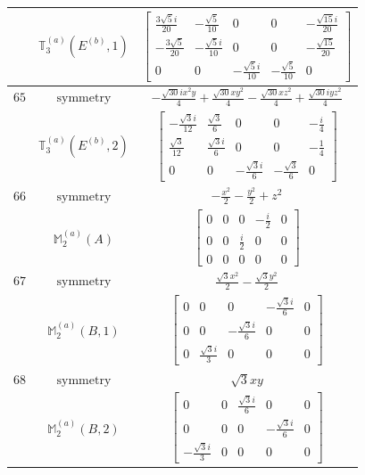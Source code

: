 \documentclass[fleqn,8pt,landscape]{jsarticle}
\begin{document}
\begin{longtable}{ccc}
$  $ & $ \mathbb{T}_{3}^{(a)}(E^{(b)},1) $ & $ \begin{bmatrix} \frac{3 \sqrt{5} i}{20} & - \frac{\sqrt{5}}{10} & 0 & 0 & - \frac{\sqrt{15} i}{20} \\ - \frac{3 \sqrt{5}}{20} & - \frac{\sqrt{5} i}{10} & 0 & 0 & - \frac{\sqrt{15}}{20} \\ 0 & 0 & - \frac{\sqrt{5} i}{10} & - \frac{\sqrt{5}}{10} & 0 \end{bmatrix} $ \\ \hline
$ 65 $ & $ \text{symmetry} $ & $ - \frac{\sqrt{30} i x^{2} y}{4} + \frac{\sqrt{30} x y^{2}}{4} - \frac{\sqrt{30} x z^{2}}{4} + \frac{\sqrt{30} i y z^{2}}{4} $ \\
$  $ & $ \mathbb{T}_{3}^{(a)}(E^{(b)},2) $ & $ \begin{bmatrix} - \frac{\sqrt{3} i}{12} & \frac{\sqrt{3}}{6} & 0 & 0 & - \frac{i}{4} \\ \frac{\sqrt{3}}{12} & \frac{\sqrt{3} i}{6} & 0 & 0 & - \frac{1}{4} \\ 0 & 0 & - \frac{\sqrt{3} i}{6} & - \frac{\sqrt{3}}{6} & 0 \end{bmatrix} $ \\ \hline
$ 66 $ & $ \text{symmetry} $ & $ - \frac{x^{2}}{2} - \frac{y^{2}}{2} + z^{2} $ \\
$  $ & $ \mathbb{M}_{2}^{(a)}(A) $ & $ \begin{bmatrix} 0 & 0 & 0 & - \frac{i}{2} & 0 \\ 0 & 0 & \frac{i}{2} & 0 & 0 \\ 0 & 0 & 0 & 0 & 0 \end{bmatrix} $ \\ \hline
$ 67 $ & $ \text{symmetry} $ & $ \frac{\sqrt{3} x^{2}}{2} - \frac{\sqrt{3} y^{2}}{2} $ \\
$  $ & $ \mathbb{M}_{2}^{(a)}(B,1) $ & $ \begin{bmatrix} 0 & 0 & 0 & - \frac{\sqrt{3} i}{6} & 0 \\ 0 & 0 & - \frac{\sqrt{3} i}{6} & 0 & 0 \\ 0 & \frac{\sqrt{3} i}{3} & 0 & 0 & 0 \end{bmatrix} $ \\ \hline
$ 68 $ & $ \text{symmetry} $ & $ \sqrt{3} x y $ \\
$  $ & $ \mathbb{M}_{2}^{(a)}(B,2) $ & $ \begin{bmatrix} 0 & 0 & \frac{\sqrt{3} i}{6} & 0 & 0 \\ 0 & 0 & 0 & - \frac{\sqrt{3} i}{6} & 0 \\ - \frac{\sqrt{3} i}{3} & 0 & 0 & 0 & 0 \end{bmatrix} $ \\ \hline

\end{longtable}
\end{document}

